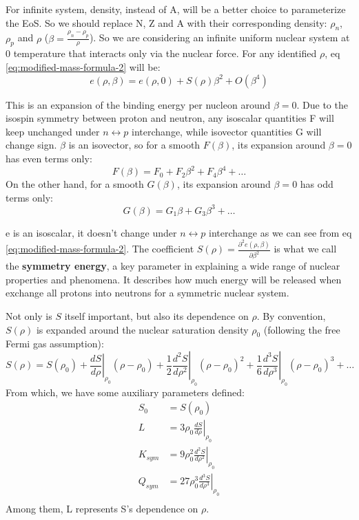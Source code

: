 For infinite system, density, instead of A, will be a better choice to parameterize
the EoS. So we should replace N, Z and A with their corresponding density: $\rho_n$, 
$\rho_p$ and $\rho$ ($\beta = \frac{\rho_n - \rho_p}{\rho}$). 
So we are considering an infinite uniform nuclear system at 0 temperature that interacts
only via the nuclear force. For any identified $\rho$,
eq \eqref{eq:modified-mass-formula-2} will be:
\begin{equation}
    \label{eq:symmetry-energy}
    e(\rho, \beta) = e(\rho, 0) + S(\rho)\beta^2 + O(\beta^4)
\end{equation}

This is an expansion of the binding energy per nucleon around $\beta = 0$.
Due to the isospin symmetry between proton and neutron, any isoscalar quantities
F will keep unchanged under $n \leftrightarrow p$ interchange, while isovector 
quantities G will change sign. $\beta$ is an isovector, so for a smooth $F(\beta)$,
its expansion around $\beta = 0$ has even terms only:
$$ F(\beta) = F_0 + F_2\beta^2 + F_4\beta^4 + \dots $$
On the other hand, for a smooth $G(\beta)$, its expansion around $\beta = 0$ has
odd terms only:
$$ G(\beta) = G_1\beta + G_3\beta^3 + \dots $$

e is an isoscalar, it doesn't change under $n \leftrightarrow p$ interchange 
as we can see from eq \eqref{eq:modified-mass-formula-2}. The coefficient 
$S(\rho) = \frac{\partial^2 e (\rho, \beta)}{\partial \beta^2}$ is
what we call the \textbf{symmetry energy}, a key parameter in explaining a wide
range of nuclear properties and phenomena. It describes how much energy will be
released when exchange all protons into neutrons for a symmetric nuclear system. 

Not only is $S$ itself important, but also its dependence on $\rho$. 
By convention, $S(\rho)$ is expanded around the nuclear saturation density $\rho_0$
(following the free Fermi gas assumption):
\begin{equation}
    S(\rho) = S(\rho_0) 
    + \left.\frac{dS}{d\rho}\right|_{\rho_0}(\rho - \rho_0)
    + \frac{1}{2}\left.\frac{d^2S}{d\rho^2}\right|_{\rho_0}(\rho - \rho_0)^2
    + \frac{1}{6}\left.\frac{d^3S}{d\rho^3}\right|_{\rho_0}(\rho - \rho_0)^3
    + \dots
\end{equation}
From which, we have some auxiliary parameters defined:
\begin{equation}
    \begin{aligned}
	S_0 &= S(\rho_0)	\\
	L   &= 3\rho_0\left.\frac{dS}{d\rho}\right|_{\rho_0}	\\
	K_{sym}	&= 9\rho_0^2\left.\frac{d^2S}{d\rho^2}\right|_{\rho_0}	\\
	Q_{sym}	&= 27\rho_0^3\left.\frac{d^3S}{d\rho^3}\right|_{\rho_0}	\\
    \end{aligned}
\end{equation}
Among them, L represents S's dependence on $\rho$.


